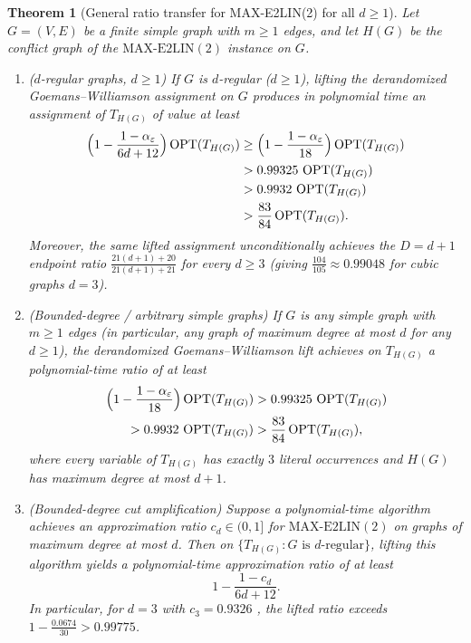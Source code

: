 \documentclass[pdflatex,sn-mathphys-num]{sn-jnl}%
\theoremstyle{thmstyleone}%
\newtheorem{Theorem}{Theorem}[section]
\theoremstyle{thmstyletwo}%
\theoremstyle{thmstylethree}%
\begin{document}
\begin{Theorem}[General ratio transfer for MAX-E2LIN(2) for all $d \ge 1$]\label{thm:general-e2lin}
Let $G=(V,E)$ be a finite simple graph with $m \ge 1$ edges, and let $H(G)$ be the conflict graph of the $\mathrm{MAX\text{-}E2LIN}(2)$ instance on $G$.
\begin{enumerate}
\item \emph{($d$-regular graphs, $d \ge 1$)} If $G$ is $d$-regular ($d \ge 1$), lifting the derandomized Goemans--Williamson assignment on $G$ produces in polynomial time an assignment of $T_{H(G)}$ of value at least
\begin{align*}
\Bigl(1 - \frac{1-\alpha_\varepsilon}{6d+12}\Bigr)\operatorname{OPT}(T_{H(G)}) &\ge \Bigl(1 - \frac{1-\alpha_\varepsilon}{18}\Bigr)\operatorname{OPT}(T_{H(G)}) \\
&> 0.99325\,\operatorname{OPT}(T_{H(G)}) \\
&> 0.9932\,\operatorname{OPT}(T_{H(G)}) \\
&> \frac{83}{84}\operatorname{OPT}(T_{H(G)}).
\end{align*}
Moreover, the same lifted assignment unconditionally achieves the $D=d+1$ endpoint ratio $\frac{21(d+1)+20}{21(d+1)+21}$ for every $d \ge 3$ (giving $\frac{104}{105} \approx 0.99048$ for cubic graphs $d=3$).
\item \emph{(Bounded-degree / arbitrary simple graphs)} If $G$ is any simple graph with $m \ge 1$ edges (in particular, any graph of maximum degree at most $d$ for any $d \ge 1$), the derandomized Goemans--Williamson lift achieves on $T_{H(G)}$ a polynomial-time ratio of at least
\begin{multline*}
\Bigl(1 - \frac{1-\alpha_\varepsilon}{18}\Bigr)\operatorname{OPT}(T_{H(G)}) > 0.99325\,\operatorname{OPT}(T_{H(G)}) \\
> 0.9932\,\operatorname{OPT}(T_{H(G)}) > \frac{83}{84}\operatorname{OPT}(T_{H(G)}),
\end{multline*}
where every variable of $T_{H(G)}$ has exactly $3$ literal occurrences and $H(G)$ has maximum degree at most $d+1$.
\item \emph{(Bounded-degree cut amplification)} Suppose a polynomial-time algorithm achieves an approximation ratio $c_d \in (0,1]$ for $\mathrm{MAX\text{-}E2LIN}(2)$ on graphs of maximum degree at most $d$. Then on $\{T_{H(G)} : G \text{ is } d\text{-regular}\}$, lifting this algorithm yields a polynomial-time approximation ratio of at least
\[
1 - \frac{1-c_d}{6d+12}.
\]
In particular, for $d=3$ with $c_3 = 0.9326$ \cite{HalperinLivnatZwick2004}, the lifted ratio exceeds $1 - \frac{0.0674}{30} > 0.99775$.
\end{enumerate}
\end{Theorem}
\end{document}
